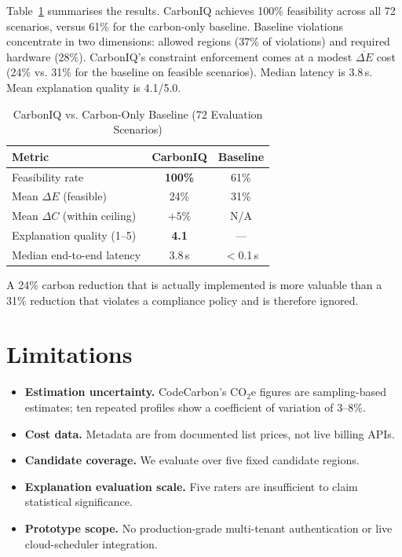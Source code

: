 ﻿\documentclass[conference]{IEEEtran}
\begin{document}
Table~\ref{tab:results} summarises the results.
CarbonIQ achieves 100\% feasibility across all 72 scenarios, versus 61\% for the
carbon-only baseline.
Baseline violations concentrate in two dimensions: allowed regions (37\% of
violations) and required hardware (28\%).
CarbonIQ's constraint enforcement comes at a modest $\overline{\Delta E}$ cost
(24\% vs. 31\% for the baseline on feasible scenarios).
Median latency is 3.8\,s.
Mean explanation quality is 4.1/5.0.

\begin{table}[htbp]
\caption{CarbonIQ vs. Carbon-Only Baseline (72 Evaluation Scenarios)}
\label{tab:results}
\centering
\begin{tabular}{lcc}
\toprule
\textbf{Metric} & \textbf{CarbonIQ} & \textbf{Baseline}\\
\midrule
Feasibility rate                 & \textbf{100\%} & 61\%        \\
Mean $\Delta E$ (feasible)       & 24\%           & 31\%        \\
Mean $\Delta C$ (within ceiling) & $+5\%$         & N/A         \\
Explanation quality (1--5)       & \textbf{4.1}   & ---         \\
Median end-to-end latency        & 3.8\,s         & $<$0.1\,s   \\
\bottomrule
\end{tabular}
\end{table}

A 24\% carbon reduction that is actually implemented is more valuable than a 31\%
reduction that violates a compliance policy and is therefore ignored.

\section{Limitations}

\begin{itemize}
\item \textbf{Estimation uncertainty.} CodeCarbon's CO$_2$e figures are
sampling-based estimates; ten repeated profiles show a coefficient of variation
of 3--8\%.
\item \textbf{Cost data.} Metadata are from documented list prices, not live billing
APIs.
\item \textbf{Candidate coverage.} We evaluate over five fixed candidate regions.
\item \textbf{Explanation evaluation scale.} Five raters are insufficient to claim
statistical significance.
\item \textbf{Prototype scope.} No production-grade multi-tenant authentication or
live cloud-scheduler integration.
\end{itemize}
\end{document}
